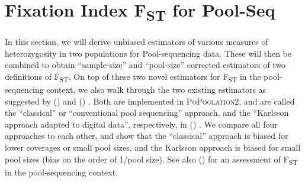 \documentclass[a4paper,fontsize=9pt,DIV=14]{scrartcl}
\newcounter{todo}
\newcommand\todo[1]{}
\newcommand\toolname{\textsc}
\newcommand{\fst}{F\textsubscript{ST}}
\newcommand\citeay[1]{\citeauthor{#1} (\citeyear{#1}) \cite{#1}}
\begin{document}



\section{Fixation Index \texorpdfstring{\fst}{FST} for Pool-Seq}
\label{supp:sec:FST}

In this section, we will derive unbiased estimators of various measures of heterozygosity in two populations for Pool-sequencing data.
These will then be combined to obtain ``sample-size'' and ``pool-size'' corrected estimators of two definitions of \fst.
On top of these two novel estimators for \fst{} in the pool-sequencing context, we also walk through the two existing estimators as suggested by \citeay{Kofler2011b} and \citeay{Karlsson2007}.
Both are implemented in \toolname{PoPoolation2}, and are called the ``classical'' or ``conventional pool sequencing'' approach, and the ``Karlsson approach adapted to digital data'', respectively, in \citeay{Kofler2011b}.
We compare all four approaches to each other, and show that the ``classical'' approach is biased for lower coverages or small pool sizes, and the Karlsson approach is biased for small pool sizes (bias on the order of 1/pool size).
See also \citeay{Hivert2018} for an assessment of \fst{} in the pool-sequencing context.


\label{supp:sec:FST:sub:Definition}
\end{document}
